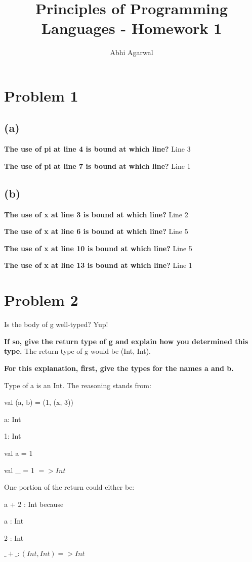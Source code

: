 \documentclass[11pt, oneside]{article}
\title{Principles of Programming Languages - Homework 1}
\author{Abhi Agarwal}
\date{}
\newcommand{\forceindent}{\leavevmode{\parindent=1.5em\indent}}
\newcommand{\forceindentx}{\leavevmode{\parindent=2em\indent}}
\begin{document}
\maketitle
\section{Problem 1}

\subsection*{(a)}
\forceindent \textbf{The use of pi at line 4 is bound at which line?} Line 3
\par \textbf{The use of pi at line 7 is bound at which line?} Line 1

\subsection*{(b)}
\forceindent \textbf{The use of x at line 3 is bound at which line?} Line 2
\par \textbf{The use of x at line 6 is bound at which line?} Line 5
\par \textbf{The use of x at line 10 is bound at which line?} Line 5
\par \textbf{The use of x at line 13 is bound at which line?} Line 1

\section{Problem 2}
\forceindent Is the body of g well-typed? Yup!
\par \textbf{If so, give the return type of g and explain how you determined this type.} The return type of g would be (Int, Int).
\par \textbf{For this explanation, first, give the types for the names a and b.}
\par Type of a is an Int. The reasoning stands from:

\par val (a, b) = (1, (x, 3))
\par \forceindentx a: Int
\par \forceindentx 1: Int
\par \forceindentx val a = 1
\par \forceindentx val \_ = 1 $=> Int$

\par One portion of the return could either be:

\par a + 2 : Int because
\par  \forceindentx a : Int
\par \forceindentx 2 : Int
\par \forceindentx $\_ + \_: (Int, Int) => Int$
\end{document}
